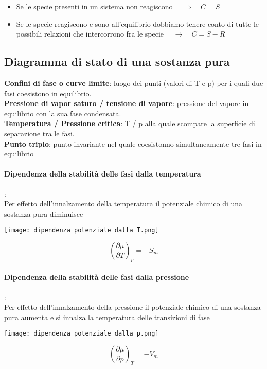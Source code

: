 \documentclass{article}
\newcommand{\so}{\quad \rightarrow \quad}
\newcommand{\So}{\quad \Rightarrow \quad}
\begin{document}
\begin{itemize}
	\item Se le specie presenti in un sistema non reagiscono $\So C=S$
	\item Se le specie reagiscono e sono all'equilibrio dobbiamo tenere conto di tutte le possibili relazioni che intercorrono fra le specie $\so C=S-R$
\end{itemize}

\subsection{Diagramma di stato di una sostanza pura}
\textbf{Confini di fase o curve limite}: luogo dei punti (valori di T e p) per i quali due fasi coesistono in equilibrio.
\\ \textbf{Pressione di vapor saturo / tensione di vapore}: pressione del vapore in equilibrio con la sua fase condensata.\\
\textbf{Temperatura / Pressione critica}: T / p alla quale scompare la superficie di separazione tra le fasi. \\
\textbf{Punto triplo}: punto invariante nel quale coesistonno simultaneamente tre fasi in equilibrio

\paragraph{Dipendenza della stabilità delle fasi dalla temperatura}:
\\ Per effetto dell'innalzamento della temperatura il potenziale chimico di una sostanza pura diminuisce
\begin{center}
    \texttt{[image: dipendenza potenziale dalla T.png]}
\end{center}
\begin{equation*}
    (\frac{\partial \mu}{\partial T})_p=-S_m
\end{equation*}

\paragraph{Dipendenza della stabilità delle fasi dalla pressione}:
\\ Per effetto dell'innalzamento della pressione il potenziale chimico di una sostanza pura aumenta e si innalza la temperatura delle transizioni di fase
\begin{center}
    \texttt{[image: dipendenza potenziale dalla p.png]}
\end{center}
\begin{equation*}
    (\frac{\partial \mu}{\partial p})_T=-V_m
\end{equation*}
\end{document}
